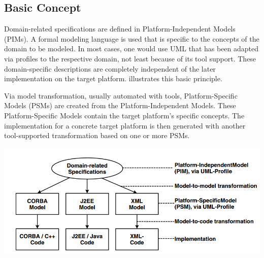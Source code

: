 \vfill\break
\subsection{Basic Concept}

Domain-related specifications are defined in Platform-Independent Models (PIMs). A formal modeling language is used that is specific to the concepts of the domain to be modeled. In most cases, one would use UML that has been adapted via profiles to the respective domain, not least because of its tool support. These domain-specific descriptions are completely independent of the later implementation on the target platform.  illustrates this basic principle.

Via model transformation, usually automated with tools, Platform-Specific Models (PSMs) are created from the Platform-Independent Models. These Platform-Specific Models contain the target platform’s specific concepts. The implementation for a concrete target platform is then generated with another tool-supported transformation based on one or more PSMs.

\begin{strip}
    \centering\noindent
    \includegraphics[scale = 0.7]{img/MDA-basic.PNG}
    \label{fig:MDA-basic}
\end{strip}




